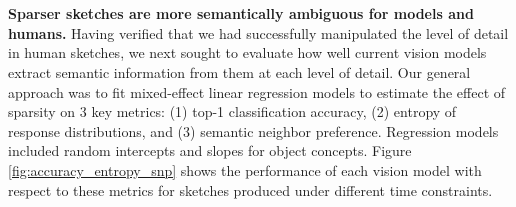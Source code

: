\documentclass{article}
\begin{document}

\begin{table}[t!!]
    \centering
    \\\
    \caption{Human sketch understanding under each draw duration constraint. Columns represent means and standard errors of the mean for top-1 accuracy, response entropy, and semantic neighbour preference (SNP).}
    \vspace{-2em}
    \label{tab:human_performance}
\end{table}



\textbf{Sparser sketches are more semantically ambiguous for models and humans.}
Having verified that we had successfully manipulated the level of detail in human sketches, we next sought to evaluate how well current vision models extract semantic information from them at each level of detail. 
Our general approach was to fit mixed-effect linear regression models to estimate the effect of sparsity on 3 key metrics: (1) top-1 classification accuracy, (2) entropy of response distributions, and (3) semantic neighbor preference. Regression models included random intercepts and slopes for object concepts.
Figure \ref{fig:accuracy_entropy_snp} shows the performance of each vision model with respect to these metrics for sketches produced under different time constraints.
\end{document}
